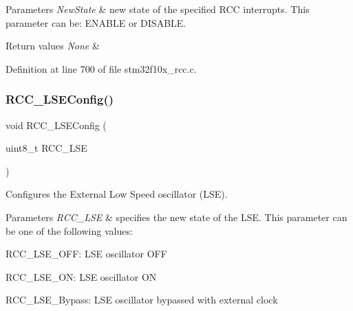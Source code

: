 \begin{DoxyParams}{Parameters}
{\em New\+State} & new state of the specified R\+CC interrupts. This parameter can be\+: E\+N\+A\+B\+LE or D\+I\+S\+A\+B\+LE. \\
\hline
\end{DoxyParams}

\begin{DoxyRetVals}{Return values}
{\em None} & \\
\hline
\end{DoxyRetVals}


Definition at line 700 of file stm32f10x\+\_\+rcc.\+c.

\mbox{\label{group___r_c_c___exported___functions_ga65209ab5c3589b249c7d70f978735ca6}} 
\subsubsection{\texorpdfstring{R\+C\+C\+\_\+\+L\+S\+E\+Config()}{RCC\_LSEConfig()}}
{\footnotesize\ttfamily void R\+C\+C\+\_\+\+L\+S\+E\+Config (\begin{DoxyParamCaption}\item[{uint8\+\_\+t}]{R\+C\+C\+\_\+\+L\+SE }\end{DoxyParamCaption})}



Configures the External Low Speed oscillator (L\+SE). 


\begin{DoxyParams}{Parameters}
{\em R\+C\+C\+\_\+\+L\+SE} & specifies the new state of the L\+SE. This parameter can be one of the following values\+: \begin{DoxyItemize}
\item R\+C\+C\+\_\+\+L\+S\+E\+\_\+\+O\+FF\+: L\+SE oscillator O\+FF \item R\+C\+C\+\_\+\+L\+S\+E\+\_\+\+ON\+: L\+SE oscillator ON \item R\+C\+C\+\_\+\+L\+S\+E\+\_\+\+Bypass\+: L\+SE oscillator bypassed with external clock \end{DoxyItemize}
\\
\hline
\end{DoxyParams}

